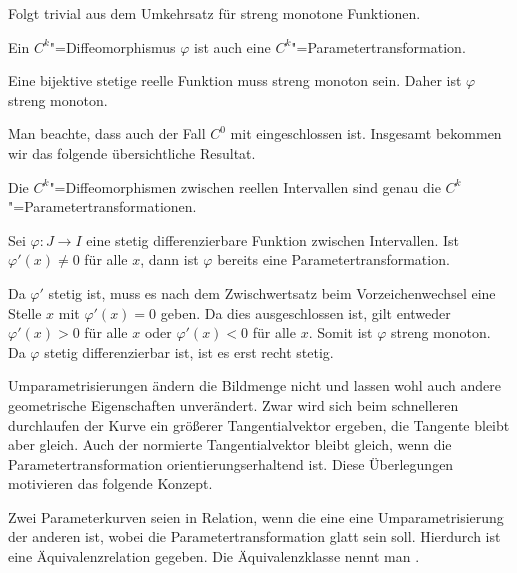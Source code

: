 \noindent{}
Folgt trivial aus dem Umkehrsatz für streng monotone
Funktionen.\;\qedsymbol

\begin{corollary}
Ein $C^k$"=Diffeomorphismus $\varphi$ ist auch eine
$C^k$"=Parametertransformation.
\end{corollary}

\noindent{}
Eine bijektive stetige reelle Funktion muss streng monoton sein.
Daher ist $\varphi$ streng monoton.\;\qedsymbol

Man beachte, dass auch der Fall $C^0$ mit eingeschlossen ist.
Insgesamt bekommen wir das folgende übersichtliche Resultat.

\begin{corollary}
Die $C^k$"=Diffeomorphismen zwischen reellen Intervallen sind
genau die $C^k$"=Parametertransformationen.
\end{corollary}

\begin{corollary}
Sei $\varphi\colon J\to I$ eine stetig differenzierbare
Funktion zwischen Intervallen. Ist $\varphi'(x)\ne 0$ für alle $x$,
dann ist $\varphi$ bereits eine Parametertransformation.
\end{corollary}

\noindent{}
Da $\varphi'$ stetig ist, muss es nach dem Zwischwertsatz beim
Vorzeichenwechsel eine Stelle $x$ mit $\varphi'(x)=0$ geben. Da
dies ausgeschlossen ist, gilt entweder $\varphi'(x)>0$ für alle $x$
oder $\varphi'(x)<0$ für alle $x$. Somit ist $\varphi$ streng monoton.
Da $\varphi$ stetig differenzierbar ist, ist es erst recht
stetig.\;\qedsymbol

Umparametrisierungen ändern die Bildmenge nicht und lassen wohl auch
andere geometrische Eigenschaften unverändert. Zwar wird sich
beim schnelleren durchlaufen der Kurve ein größerer Tangentialvektor
ergeben, die Tangente bleibt aber gleich. Auch der normierte
Tangentialvektor bleibt gleich, wenn die Parametertransformation
orientierungserhaltend ist. Diese Überlegungen motivieren das folgende
Konzept.

\begin{definition}
Zwei Parameterkurven seien in Relation, wenn die eine eine
Umparametrisierung der anderen ist, wobei die Parametertransformation
glatt sein soll. Hierdurch ist eine 
Äquivalenzrelation gegeben. Die Äquivalenzklasse nennt man
.
\end{definition}

